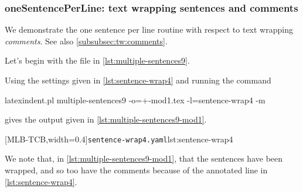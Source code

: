 \subsubsection{oneSentencePerLine: text wrapping sentences and comments}\label{subsubsec:ospl:tw:comments}
 We demonstrate the one sentence per line routine with respect to text wrapping
 \emph{comments}. See also \cref{subsubsec:tw:comments}. 
   

 \begin{example}
 Let's begin with the file in \cref{lst:multiple-sentences9}.


 Using the settings given in \cref{lst:sentence-wrap4} and running the command

 \begin{commandshell}
latexindent.pl multiple-sentences9 -o=+-mod1.tex -l=sentence-wrap4 -m
   \end{commandshell}

 gives the output given in \cref{lst:multiple-sentences9-mod1}.

 \begin{cmhtcbraster}[raster columns=2,
   raster left skip=-1.5cm,
   raster right skip=-0cm,
   raster column skip=.06\linewidth]
  [MLB-TCB,width=0.4\linewidth]{\texttt{sentence-wrap4.yaml}}{lst:sentence-wrap4}
 \end{cmhtcbraster}

 We note that, in \cref{lst:multiple-sentences9-mod1}, that the sentences have been
 wrapped, and so too have the comments because of the annotated line in
 \cref{lst:sentence-wrap4}.
 \end{example}

